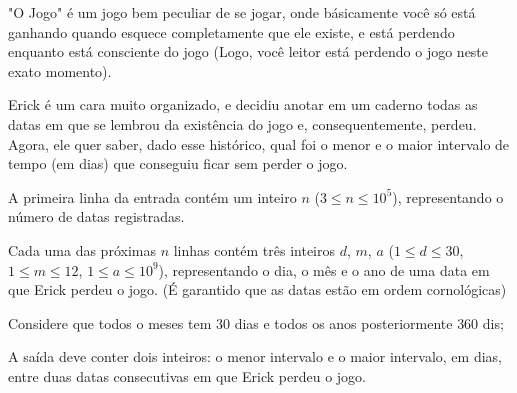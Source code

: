 "O Jogo" é um jogo bem peculiar de se jogar, onde básicamente você só está ganhando quando esquece completamente que ele existe, e está perdendo enquanto está consciente do jogo (Logo, você leitor está perdendo o jogo neste exato momento).  

Erick é um cara muito organizado, e decidiu anotar em um caderno todas as datas em que se lembrou da existência do jogo e, consequentemente, perdeu. Agora, ele quer saber, dado esse histórico, qual foi o menor e o maior intervalo de tempo (em dias) que conseguiu ficar sem perder o jogo.

A primeira linha da entrada contém um inteiro $n$ ($3 \leq n \leq 10^5$), representando o número de datas registradas.  

Cada uma das próximas $n$ linhas contém três inteiros $d$, $m$, $a$ ($1 \leq d \leq 30$, $1 \leq m \leq 12$, $1 \leq a \leq 10^9$), representando o dia, o mês e o ano de uma data em que Erick perdeu o jogo. (É garantido que as datas estão em ordem cornológicas)

Considere que todos o meses tem $30$ dias e todos os anos posteriormente $360$ dis;

A saída deve conter dois inteiros: o menor intervalo e o maior intervalo, em dias, entre duas datas consecutivas em que Erick perdeu o jogo.



